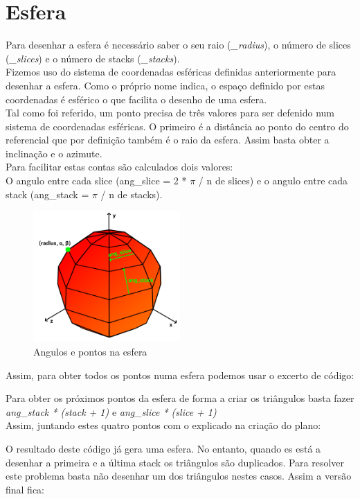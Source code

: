 \documentclass[a4paper]{report}
\begin{document}
\section{Esfera}
Para desenhar a esfera é necessário saber o seu raio (\textit{\_radius}), o
número de slices (\textit{\_slices}) e o número de stacks (\textit{\_stacks}).\\
Fizemos uso do sistema de coordenadas esféricas definidas
anteriormente para desenhar a esfera. Como o próprio nome indica, o espaço
definido por estas coordenadas é esférico o que facilita o desenho de uma
esfera.\\
Tal como foi referido, um ponto precisa de três valores para ser defenido num
sistema de coordenadas esféricas. O primeiro é a distância ao ponto do centro do
referencial que por definição também é o raio da esfera. Assim basta obter a
inclinação e o azimute.\\
Para facilitar estas contas são calculados dois valores:\\
O angulo entre cada slice (ang\_slice = 2 * $\pi$ / n de slices) e o angulo
entre cada stack (ang\_stack = $\pi$ / n de stacks).\\
\begin{figure}[H]
    \centering 
    \includegraphics[width=0.5\textwidth]{images/sphere_vetores.png}  
    \caption{Angulos e pontos na esfera}
    \label{fig:sphere}
\end{figure}
Assim, para obter todos os pontos numa esfera podemos usar o excerto de código:


Para obter os próximos pontos da esfera de forma a criar os triângulos basta
fazer \textit{ang\_stack * (stack + 1)} e \textit{ang\_slice * (slice + 1)}\\
Assim, juntando estes quatro pontos com o explicado na criação do plano:


O resultado deste código já gera uma esfera. No entanto, quando es está a
desenhar a primeira e a última stack os triângulos são duplicados.
Para resolver este problema basta não desenhar um dos triângulos nestes casos.
Assim a versão final fica:
\end{document}
